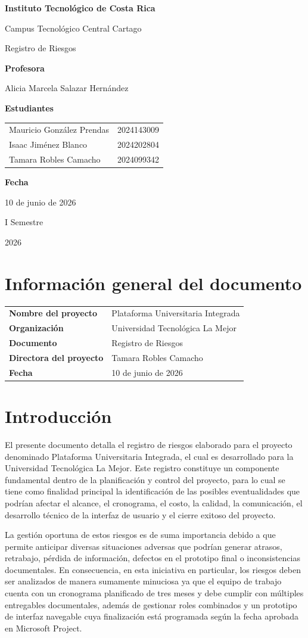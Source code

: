 \documentclass[11pt,spanish]{article}
\title{\DocumentoTitulo}
\author{\AutoresPortada}
\date{\FechaDocumento}
\makeatletter
\newcommand{\Institucion}{Instituto Tecnológico de Costa Rica}
\newcommand{\Campus}{Campus Tecnológico Central Cartago}
\newcommand{\DocumentoTitulo}{Registro de Riesgos}
\newcommand{\Profesor}{Alicia Marcela Salazar Hernández}
\newcommand{\FechaDocumento}{10 de junio de 2026}
\newcommand{\PeriodoAcademico}{I Semestre}
\newcommand{\AnioDocumento}{2026}
\newcommand{\AutoresPortada}{%
    \begin{tabular}{l@{\hspace{1.5cm}}r}
        Mauricio González Prendas & 2024143009 \\
        Isaac Jiménez Blanco & 2024202804 \\
        Tamara Robles Camacho & 2024099342 \\
    \end{tabular}%
}
\newcommand{\MakeCover}{%
\begin{titlepage}
\thispagestyle{empty}
\centering

{\bfseries \huge \Institucion \par}
\vspace{0.25cm}
{\LARGE \Campus \par}

\vfill

{\huge \DocumentoTitulo \par}

\vfill

{\bfseries \LARGE Profesora \par}
{\Large \Profesor \par}

\vfill

{\bfseries \LARGE Estudiantes \par}
{\Large \AutoresPortada \par}

\vfill

{\bfseries\LARGE Fecha \par}
{\Large \FechaDocumento \par}

\vfill

{\LARGE \PeriodoAcademico \par}
{\LARGE \AnioDocumento \par}

\end{titlepage}%
}
\makeatother
\begin{document}
\hypersetup{pageanchor=false}

\MakeCover

\pagestyle{empty}
\tableofcontents
\clearpage
{}
\hypersetup{pageanchor=true}
\pagestyle{fancy}

\section{Información general del documento}

\begin{table}[H]
\centering
\begin{tabularx}{\textwidth}{p{5cm} Y}
\toprule
\textbf{Nombre del proyecto} & Plataforma Universitaria Integrada \\
\textbf{Organización} & Universidad Tecnológica La Mejor \\
\textbf{Documento} & \DocumentoTitulo \\
\textbf{Directora del proyecto} & Tamara Robles Camacho \\
\textbf{Fecha} & \FechaDocumento \\
\bottomrule
\end{tabularx}
\end{table}

\section{Introducción}

El presente documento detalla el registro de riesgos elaborado para el proyecto denominado Plataforma Universitaria Integrada, el cual es desarrollado para la Universidad Tecnológica La Mejor. Este registro constituye un componente fundamental dentro de la planificación y control del proyecto, para lo cual se tiene como finalidad principal la identificación de las posibles eventualidades que podrían afectar el alcance, el cronograma, el costo, la calidad, la comunicación, el desarrollo técnico de la interfaz de usuario y el cierre exitoso del proyecto.

La gestión oportuna de estos riesgos es de suma importancia debido a que permite anticipar diversas situaciones adversas que podrían generar atrasos, retrabajo, pérdida de información, defectos en el prototipo final o inconsistencias documentales. En consecuencia, en esta iniciativa en particular, los riesgos deben ser analizados de manera sumamente minuciosa ya que el equipo de trabajo cuenta con un cronograma planificado de tres meses y debe cumplir con múltiples entregables documentales, además de gestionar roles combinados y un prototipo de interfaz navegable cuya finalización está programada según la fecha aprobada en Microsoft Project.
\end{document}
